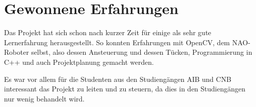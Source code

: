     \section{Gewonnene Erfahrungen}

        Das Projekt hat sich schon nach kurzer Zeit für einige als sehr gute
        Lernerfahrung herausgestellt.
        So konnten Erfahrungen mit OpenCV, dem NAO-Roboter selbst, also dessen
        Ansteuerung und dessen Tücken, Programmierung in C++ und auch
        Projektplanung gemacht werden.

        Es war vor allem für die Studenten aus den Studiengängen AIB und CNB
        interessant das Projekt zu leiten und zu steuern, da dies in den
        Studiengängen nur wenig behandelt wird.

